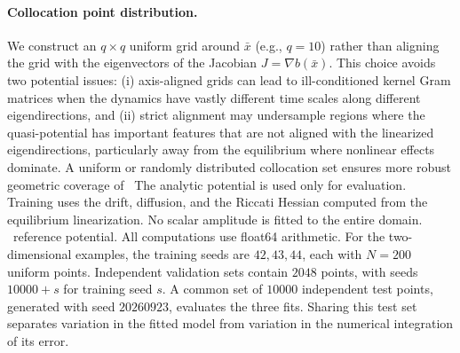 \documentclass[11pt]{article}
\theoremstyle{plain}      %
\theoremstyle{definition} %
\providecommand{\DIFaddtex}[1]{{\protect\color{blue}#1}} %
\providecommand{\DIFdeltex}[1]{{\protect\color{red}#1}} %
\providecommand{\DIFaddbegin}{} %
\providecommand{\DIFaddend}{} %
\providecommand{\DIFdelbegin}{} %
\providecommand{\DIFdelend}{} %
\providecommand{\DIFadd}[1]{\texorpdfstring{\DIFaddtex{#1}}{#1}} %
\providecommand{\DIFdel}[1]{\texorpdfstring{\DIFdeltex{#1}}{}} %
\newcommand{\DIFscaledelfig}{1.0}
\newlength{\DIFdelgraphicswidth} %
\newlength{\DIFdelgraphicsheight} %
\newcommand{\DIFaddincludegraphics}[2][]{{\color{blue}\fbox{\DIFOincludegraphics[#1]{#2}}}} %
\newcommand{\DIFdelincludegraphics}[2][]{%
\sbox{\DIFdelgraphicsbox}{\DIFOincludegraphics[#1]{#2}}%
\settoboxwidth{\DIFdelgraphicswidth}{\DIFdelgraphicsbox} %
\settoboxtotalheight{\DIFdelgraphicsheight}{\DIFdelgraphicsbox} %
\scalebox{\DIFscaledelfig}{%
\parbox[b]{\DIFdelgraphicswidth}{\usebox{\DIFdelgraphicsbox}\\[-\baselineskip] \rule{\DIFdelgraphicswidth}{0em}}\llap{\resizebox{\DIFdelgraphicswidth}{\DIFdelgraphicsheight}{%
\setlength{\unitlength}{\DIFdelgraphicswidth}%
\begin{picture}(1,1)%
\thicklines\linethickness{2pt} %
{\color[rgb]{1,0,0}\put(0,0){\framebox(1,1){}}}%
{\color[rgb]{1,0,0}\put(0,0){\line( 1,1){1}}}%
{\color[rgb]{1,0,0}\put(0,1){\line(1,-1){1}}}%
\end{picture}%
}\hspace*{3pt}}} %
} %
\DeclareRobustCommand{\DIFaddbegin}{\DIFOaddbegin \let\includegraphics\DIFaddincludegraphics} %
\DeclareRobustCommand{\DIFaddend}{\DIFOaddend \let\includegraphics\DIFOincludegraphics} %
\DeclareRobustCommand{\DIFdelbegin}{\DIFOdelbegin \let\includegraphics\DIFdelincludegraphics} %
\DeclareRobustCommand{\DIFdelend}{\DIFOaddend \let\includegraphics\DIFOincludegraphics} %
\begin{document}
\DIFdelbegin \paragraph{\DIFdel{Collocation point distribution.}}
\addtocounter{paragraph}{-1}%
\DIFdel{We construct an $q \times q$ uniform grid around $\bar{x}$ (e.g., $q=10$) rather than aligning the grid with the eigenvectors of the Jacobian $J = \nabla b(\bar{x})$. This choice avoids two potential issues: (i) axis-aligned grids can lead to ill-conditioned kernel Gram matrices when the dynamics have vastly different time scales along different eigendirections, and (ii) strict alignment may undersample regions where the quasi-potential has important features that are not aligned with the linearized eigendirections, particularly away from the equilibrium where nonlinear effects dominate. A uniform or randomly distributed collocation set ensures more robust geometric coverage of }\DIFdelend\ \DIFaddbegin \DIFadd{The analytic potential is used only for evaluation. Training uses the drift, diffusion, and the Riccati Hessian computed from the equilibrium linearization. No scalar amplitude is fitted to }\DIFaddend the \DIFdelbegin \DIFdel{entire domain. }\DIFdelend\ \DIFaddbegin \DIFadd{reference potential. All computations use float64 arithmetic. For the two-dimensional examples, the training seeds are $42,43,44$, each with $N=200$ uniform points. Independent validation sets contain $2048$ points, with seeds $10000+s$ for training seed $s$. A common set of $10000$ independent test points, generated with seed $20260923$, evaluates the three fits. Sharing this test set separates variation in the fitted model from variation in the numerical integration of its error.
}\DIFaddend 
\end{document}
